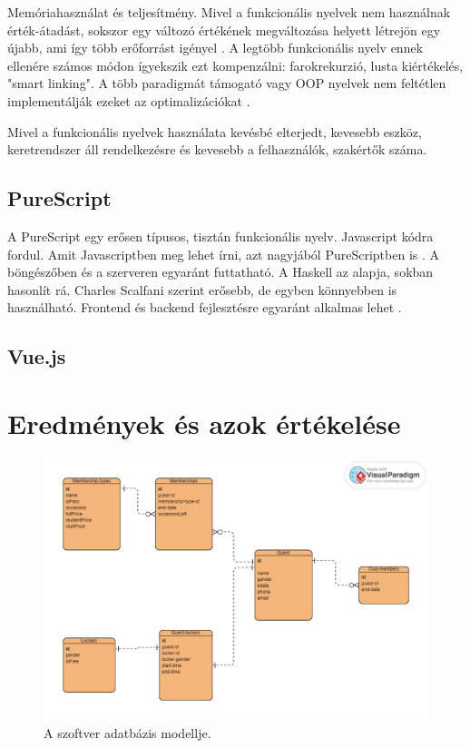 \documentclass[12pt]{article}
\begin{document}
Memóriahasználat és teljesítmény. Mivel a funkcionális nyelvek nem használnak érték-átadást, sokszor egy változó értékének megváltozása helyett létrejön egy újabb, ami így több erőforrást igényel \cite{JN}. A legtöbb funkcionális nyelv ennek ellenére számos módon ígyekszik ezt kompenzálni: farokrekurzió, lusta kiértékelés, "smart linking". A több paradigmát támogató vagy OOP nyelvek nem feltétlen implementálják ezeket az optimalizációkat \cite{JN}.

Mivel a funkcionális nyelvek használata kevésbé elterjedt, kevesebb eszköz, keretrendszer áll rendelkezésre és kevesebb a felhasználók, szakértők száma.

\subsection{PureScript}

A PureScript egy erősen típusos, tisztán funkcionális nyelv. Javascript kódra fordul. Amit Javascriptben meg lehet írni, azt nagyjából PureScriptben is \cite{CS}. A böngészőben és  a szerveren egyaránt futtatható. A Haskell az alapja, sokban hasonlít rá. Charles Scalfani \cite{CS} szerint erősebb, de egyben könnyebben is használható.
Frontend és backend fejlesztésre egyaránt alkalmas lehet \cite{CS}.

\subsection{Vue.js}

\newpage
\section{Eredmények és azok értékelése}

\begin{figure}
\includegraphics[width=\textwidth]{database}
\caption{A szoftver adatbázis modellje.}
\end{figure}
\end{document}
